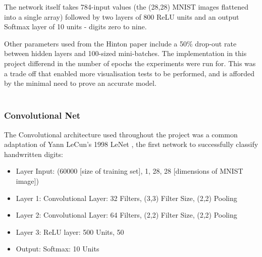 \documentclass[a4paper,11pt,titlepage]{article}
\begin{document}
	\begin{figure}[H]
	\end{figure}

		\par 
		The network itself takes 784-input values (the (28,28) MNIST images flattened into a single array) followed by two layers of 800 ReLU units and an output Softmax layer of 10 units - digits zero to nine. 
		\par 
		Other parameters used from the Hinton paper include a 50\% drop-out rate between hidden layers and 100-sized mini-batches. The implementation in this project differend in the number of epochs the experiments were run for. This was a trade off that enabled more visualisation tests to be performed, and is afforded by the minimal need to prove an accurate model.
		\\\
		\subsubsection{Convolutional Net}

		The Convolutional architecture used throughout the project was a common adaptation of Yann LeCun's 1998 LeNet \cite{LeCun1998}, the first network to successfully classify handwritten digits: 
		\begin{itemize}
			\item Layer Input: (60000 [size of training set], 1, 28, 28 [dimensions of MNIST image])
			\item Layer 1: Convolutional Layer: 32 Filters, (3,3) Filter Size, (2,2) Pooling
			\item Layer 2: Convolutional Layer: 64 Filters, (2,2) Filter Size, (2,2) Pooling
			\item Layer 3: ReLU layer: 500 Units, 50%
			\item Output: Softmax: 10 Units
		\end{itemize}
		\par 
		
\end{document}
